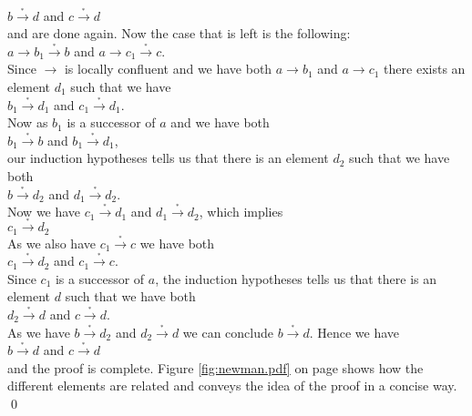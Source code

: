 \\[0.2cm]
\hspace*{1.3cm}
$b \stackrel{_*}{\rightarrow} d$ \quad and \quad $c \stackrel{_*}{\rightarrow} d$
\\[0.2cm]
and are done again.  Now the case that is left is the following:
\\[0.2cm]
\hspace*{1.3cm}
$a \rightarrow b_1 \stackrel{_*}{\rightarrow} b$ \quad and \quad $a \rightarrow c_1 \stackrel{_*}{\rightarrow} c$.
\\[0.2cm]
Since $\rightarrow$ is locally confluent and we have both $a \rightarrow b_1$ and  $a \rightarrow c_1$ 
there exists an element $d_1$ such that we have
\\[0.2cm]
\hspace*{1.3cm}
$b_1 \stackrel{_*}{\rightarrow} d_1$ \quad and \quad $c_1 \stackrel{_*}{\rightarrow} d_1$.
\\[0.2cm]
Now as $b_1$ is a successor of $a$ and we have both
\\[0.2cm]
\hspace*{1.3cm}
$b_1 \stackrel{_*}{\rightarrow} b$ \quad and \quad $b_1 \stackrel{_*}{\rightarrow} d_1$,
\\[0.2cm]
our induction hypotheses tells us that there is an element $d_2$ such that we have both
\\[0.2cm]
\hspace*{1.3cm}
$b \stackrel{_*}{\rightarrow} d_2$ \quad and \quad $d_1 \stackrel{_*}{\rightarrow} d_2$.
\\[0.2cm]
Now we have $c_1 \stackrel{_*}{\rightarrow} d_1$ and $d_1 \stackrel{_*}{\rightarrow} d_2$, which implies
\\[0.2cm]
\hspace*{1.3cm}
$c_1 \stackrel{_*}{\rightarrow} d_2$
\\[0.2cm]
As we also have $c_1 \stackrel{_*}{\rightarrow} c$ we have both
\\[0.2cm]
\hspace*{1.3cm}
$c_1 \stackrel{_*}{\rightarrow} d_2$ \quad and \quad $c_1 \stackrel{_*}{\rightarrow} c$.
\\[0.2cm]
Since $c_1$ is a successor of $a$, the induction hypotheses tells us that there is an element $d$ such that we
have both
\\[0.2cm]
\hspace*{1.3cm}
$d_2 \stackrel{_*}{\rightarrow} d$ \quad and \quad $c \stackrel{_*}{\rightarrow} d$.
\\[0.2cm]
As we have $b \stackrel{_*}{\rightarrow} d_2$ and $d_2 \stackrel{_*}{\rightarrow} d$ we can conclude $b \stackrel{_*}{\rightarrow} d$.  Hence we have
\\[0.2cm]
\hspace*{1.3cm}
$b \stackrel{_*}{\rightarrow} d$ \quad  and \quad $c \stackrel{_*}{\rightarrow} d$
\\[0.2cm]
and the proof is complete.  Figure \ref{fig:newman.pdf} on page \pageref{fig:newman.pdf} shows how the
different elements are related and conveys the idea of the proof in a concise way. \qed

